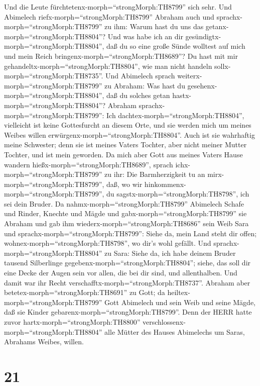Und die Leute fürchtetenx-morph=``strongMorph:TH8799'' sich sehr.
 Und Abimelech riefx-morph=``strongMorph:TH8799'' Abraham
auch und sprachx-morph=``strongMorph:TH8799'' zu ihm: Warum hast du uns
das getanx-morph=``strongMorph:TH8804''? Und was habe ich an dir
gesündigtx-morph=``strongMorph:TH8804'', daß du so eine große Sünde
wolltest auf mich und mein Reich bringenx-morph=``strongMorph:TH8689''?
Du hast mit mir gehandeltx-morph=``strongMorph:TH8804'', wie man nicht
handeln sollx-morph=``strongMorph:TH8735''.  Und Abimelech
sprach weiterx-morph=``strongMorph:TH8799'' zu Abraham: Was hast du
gesehenx-morph=``strongMorph:TH8804'', daß du solches getan
hastx-morph=``strongMorph:TH8804''?  Abraham
sprachx-morph=``strongMorph:TH8799'': Ich
dachtex-morph=``strongMorph:TH8804'', vielleicht ist keine Gottesfurcht
an diesem Orte, und sie werden mich um meines Weibes willen
erwürgenx-morph=``strongMorph:TH8804''.  Auch ist sie
wahrhaftig meine Schwester; denn sie ist meines Vaters Tochter, aber
nicht meiner Mutter Tochter, und ist mein geworden.  Da
mich aber Gott aus meines Vaters Hause wandern
hießx-morph=``strongMorph:TH8689'', sprach
ichx-morph=``strongMorph:TH8799'' zu ihr: Die Barmherzigkeit tu an
mirx-morph=``strongMorph:TH8799'', daß, wo wir
hinkommenx-morph=``strongMorph:TH8799'', du
sagstx-morph=``strongMorph:TH8798'', ich sei dein Bruder. 
Da nahmx-morph=``strongMorph:TH8799'' Abimelech Schafe und Rinder,
Knechte und Mägde und gabx-morph=``strongMorph:TH8799'' sie Abraham und
gab ihm wiederx-morph=``strongMorph:TH8686'' sein Weib Sara
 und sprachx-morph=``strongMorph:TH8799'': Siehe da, mein
Land steht dir offen; wohnex-morph=``strongMorph:TH8798'', wo dir's wohl
gefällt.  Und sprachx-morph=``strongMorph:TH8804'' zu Sara:
Siehe da, ich habe deinem Bruder tausend Silberlinge
gegebenx-morph=``strongMorph:TH8804''; siehe, das soll dir eine Decke
der Augen sein vor allen, die bei dir sind, und allenthalben. Und damit
war ihr Recht verschafftx-morph=``strongMorph:TH8737''. 
Abraham aber betetex-morph=``strongMorph:TH8691'' zu Gott; da
heiltex-morph=``strongMorph:TH8799'' Gott Abimelech und sein Weib und
seine Mägde, daß sie Kinder gebarenx-morph=``strongMorph:TH8799''.
 Denn der HERR hatte zuvor
hartx-morph=``strongMorph:TH8800''
verschlossenx-morph=``strongMorph:TH8804'' alle Mütter des Hauses
Abimelechs um Saras, Abrahams Weibes, willen.

\hypertarget{section-20}{%
\section{21}\label{section-20}}

